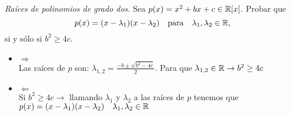 \item \textit{Raíces de polinomios de grado dos.} Sea $p(x)=x^2+bx+c\in\mathbb{R}[x]$. Probar que 
\[p(x)=(x-\lambda_1)(x-\lambda_2)\quad\text{para}\quad\lambda_1,\lambda_2\in\mathbb{R},\]
    si y sólo si $b^2\geq 4c$.
    \begin{mdframed}[style=s]
        \begin{itemize}
            \item $\Rightarrow$\\
                Las raíces de $p$ son: $\lambda_{1,2}=\frac{-b\pm\sqrt{b^2-4c}}{2}$. Para que $\lambda_{1,2}\in\mathbb{R}\to b^2\geq4c$
            \item $\Leftarrow$\\
                Si $b^2\geq4c\to$ llamando $\lambda_1$ y $\lambda_2$ a las raíces de $p$ tenemos que $p(x)=(x-\lambda_1)(x-\lambda_2)\quad \lambda_1,\lambda_2\in\mathbb{R}$
        \end{itemize}
    \end{mdframed}